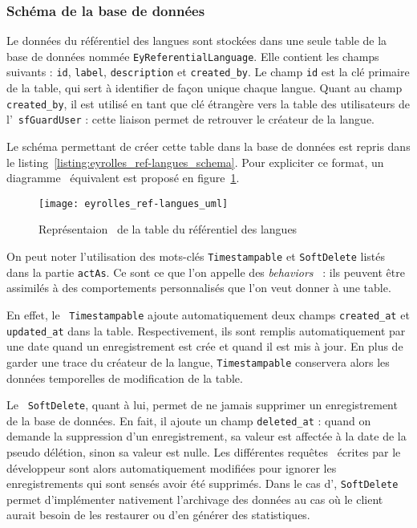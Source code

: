 \subsubsection{Schéma de la base de données}

Le données du référentiel des langues sont stockées dans une seule table de la base de données nommée \texttt{EyReferentialLanguage}. Elle contient les champs suivants : \texttt{id}, \texttt{label}, \texttt{description} et \texttt{created\_by}. Le champ \texttt{id} est la clé primaire de la table, qui sert à identifier de façon unique chaque langue. Quant au champ \texttt{created\_by}, il est utilisé en tant que clé étrangère vers la table des utilisateurs de l'\aintranet\ \texttt{sfGuardUser} : cette liaison permet de retrouver le créateur de la langue.

Le schéma permettant de créer cette table dans la base de données est repris dans le listing~\ref{listing:eyrolles_ref-langues_schema}. Pour expliciter ce format, un diagramme \auml\ équivalent est proposé en figure~\ref{figure:eyrolles_ref-langues_uml}.

\begin{figure}
	\centering
	\texttt{[image: eyrolles\_ref-langues\_uml]}
	\caption{Représentaion \auml\ de la table du référentiel des langues}
	\label{figure:eyrolles_ref-langues_uml}
\end{figure}

On peut noter l'utilisation des mots-clés \texttt{Timestampable} et \texttt{SoftDelete} listés dans la partie \texttt{actAs}. Ce sont ce que l'on appelle des \emph{behaviors} \adoctrine\ : ils peuvent être assimilés à des comportements personnalisés que l'on veut donner à une table.

En effet, le \abehavior\ \texttt{Timestampable} ajoute automatiquement deux champs \texttt{created\_at} et \texttt{updated\_at} dans la table. Respectivement, ils sont remplis automatiquement par une date quand un enregistrement est crée et quand il est mis à jour. En plus de garder une trace du créateur de la langue, \texttt{Timestampable} conservera alors les données temporelles de modification de la table.

Le \abehavior\ \texttt{SoftDelete}, quant à lui, permet de ne jamais supprimer un enregistrement de la base de données. En fait, il ajoute un champ \texttt{deleted\_at} : quand on demande la suppression d'un enregistrement, sa valeur est affectée à la date de la pseudo délétion, sinon sa valeur est nulle. Les différentes requêtes \adoctrine\ écrites par le développeur sont alors automatiquement modifiées pour ignorer les enregistrements qui sont sensés avoir été supprimés. Dans le cas d'\aey, \texttt{SoftDelete} permet d'implémenter nativement l'archivage des données au cas où le client aurait besoin de les restaurer ou d'en générer des statistiques.


